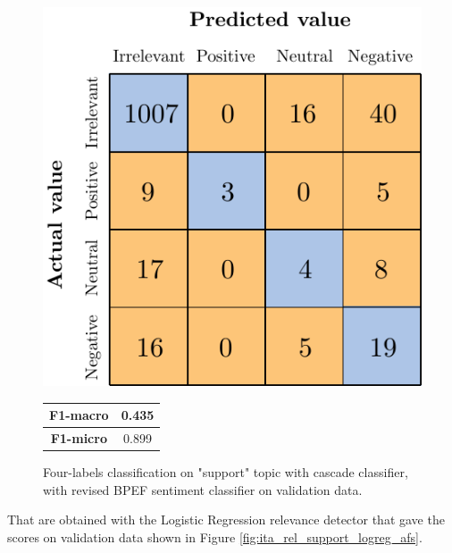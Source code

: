\begin{figure}[H]
	\begin{minipage}[b]{0.6\linewidth}
		\centering
		\includegraphics[scale=1]{figures/conf_matrices/ita_support/ita_cascade_support_bpef_val.pdf}
	\end{minipage}
	\begin{minipage}[b]{0.3\linewidth}
		\begin{tabular}[b]{ | c | c | } 
			\hline
			\textbf{F1-macro} & 0.435 \\
			\hline
			\textbf{F1-micro} & 0.899 \\ 
			\hline
		\end{tabular}
	\end{minipage}
	\caption{Four-labels classification on "support" topic with cascade classifier, with revised BPEF sentiment classifier on validation data.}
	\label{fig:ita_cascade_support_bpef_val}
\end{figure}

That are obtained with the Logistic Regression relevance detector that gave the scores on validation data shown in Figure \ref{fig:ita_rel_support_logreg_afs}.



